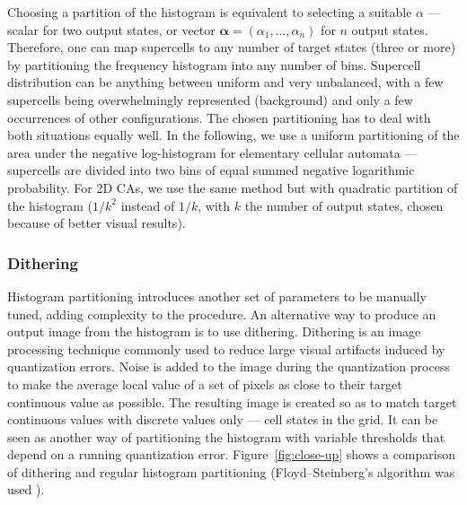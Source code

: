Choosing a partition of the histogram is equivalent to selecting a suitable
$\alpha$ --- scalar for two output states, or vector $\mathbf{\alpha} =
(\alpha_1, \ldots, \alpha_n)$ for $n$ output states. Therefore, one can map
supercells to any number of target states (three or more) by partitioning the
frequency histogram into any number of bins. Supercell distribution can be
anything between uniform and very unbalanced, with a few supercells being
overwhelmingly represented (background) and only a few occurrences of other
configurations. The chosen partitioning has to deal with both situations equally
well. In the following, we use a uniform partitioning of the area under the
negative log-histogram for elementary cellular automata --- supercells are
divided into two bins of equal summed negative logarithmic probability. For 2D
CAs, we use the same method but with quadratic partition of the histogram
($1/k^2$ instead of $1/k$, with $k$ the number of output states, chosen because
of better visual results).

\subsubsection{Dithering}\label{sec:dithering}
Histogram partitioning introduces another set of parameters to be manually
tuned, adding complexity to the procedure. An alternative way to produce an
output image from the histogram is to use dithering. Dithering is an image
processing technique commonly used to reduce large visual artifacts induced by
quantization errors. Noise is added to the image during the quantization process
to make the average local value of a set of pixels as close to their target
continuous value as possible. The resulting image is created so as to match
target continuous values with discrete values only --- cell states in the grid.
It can be seen as another way of partitioning the histogram with variable
thresholds that depend on a running quantization error.
Figure~\ref{fig:close-up} shows a comparison of dithering and regular histogram
partitioning (Floyd–Steinberg's algorithm was used
\parencite{floydAdaptiveAlgorithmSpatial1976}).

